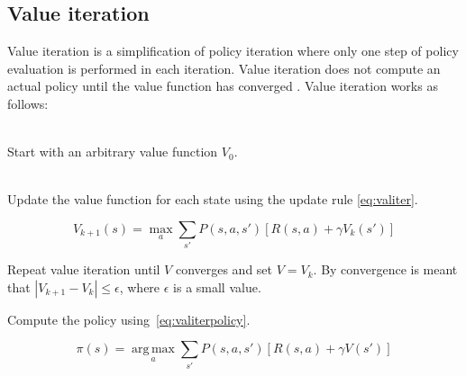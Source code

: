 \subsection{Value iteration}
\label{sec:valueiteration}

Value iteration is a simplification of policy iteration where only one step of
policy evaluation is performed in each iteration. Value iteration does not compute an actual
policy until the value function has converged \parencite{barto1998reinforcement}. Value iteration works as follows:

\begin{description}
\item[Initialization] \hfill \\
    Start with an arbitrary value function $V_0$.
\item[Value iteration] \hfill \\
    Update the value function for each state using the update rule \eqref{eq:valiter}.

\begin{equation} \label{eq:valiter}
V_{k+1}(s) = \max_a \sum_{s'}{P(s, a, s') \left[R(s, a) + \gamma V_k(s')\right]}
\end{equation}

\item Repeat value iteration until $V$ converges and set $V = V_k$. By
  convergence is meant that $|V_{k+1} - V_{k}| \leq \epsilon$, where
  $\epsilon$ is a small value. 

\item Compute the policy using~\eqref{eq:valiterpolicy}.

\begin{equation} \label{eq:valiterpolicy}
\pi(s) = \operatorname*{arg\,max}_a \sum_{s'}{P(s, a, s') \left[R(s, a) + \gamma V(s')\right]}
\end{equation}

\end{description}
